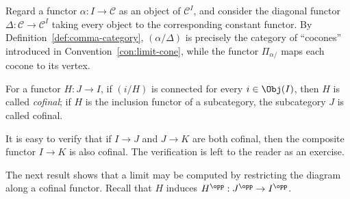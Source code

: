 \begin{example}\label{eg:comma-vs-cone}
	Regard a functor $\alpha: I \to \mathcal{C}$ as an object of
	$\mathcal{C}^I$, and consider the diagonal functor
	$\Delta: \mathcal{C} \to \mathcal{C}^I$ taking every object to the
	corresponding constant functor. By Definition~\ref{def:comma-category},
	$(\alpha/\Delta)$ is precisely the category of ``cocones'' introduced in
	Convention~\ref{con:limit-cone}, while the functor $\Pi_{\alpha/}$ maps each
	cocone to its vertex.
\end{example}

\begin{definition}\label{def:cofinal} 
	For a functor $H: J \to I$, if $(i/H)$ is connected for every
	$i \in \Obj(I)$, then $H$ is called \emph{cofinal}; if $H$ is the inclusion
	functor of a subcategory, the subcategory $J$ is called cofinal.
\end{definition}

It is easy to verify that if $I \to J$ and $J \to K$ are both cofinal, then
the composite functor $I \to K$ is also cofinal. The verification is left to
the reader as an exercise.

The next result shows that a limit may be computed by restricting the diagram
along a cofinal functor. Recall that $H$ induces
$H^{\opp}: J^{\opp} \to I^{\opp}$.

